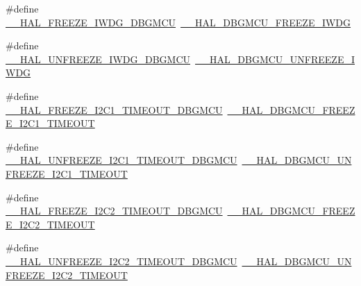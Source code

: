 \begin{DoxyCompactItemize}
\item 
\#define \hyperlink{group___h_a_l___d_b_g_m_c_u___aliased___macros_ga683080f08b123e73ee801508fac33188}{\+\_\+\+\_\+\+H\+A\+L\+\_\+\+F\+R\+E\+E\+Z\+E\+\_\+\+I\+W\+D\+G\+\_\+\+D\+B\+G\+M\+CU}~\hyperlink{group___h_a_l___exported___macros_gabab7ab631ba58fb6246a9385e8af9d0d}{\+\_\+\+\_\+\+H\+A\+L\+\_\+\+D\+B\+G\+M\+C\+U\+\_\+\+F\+R\+E\+E\+Z\+E\+\_\+\+I\+W\+DG}
\item 
\#define \hyperlink{group___h_a_l___d_b_g_m_c_u___aliased___macros_ga73aaa0abfab57e061c9e64ee39f5e3c8}{\+\_\+\+\_\+\+H\+A\+L\+\_\+\+U\+N\+F\+R\+E\+E\+Z\+E\+\_\+\+I\+W\+D\+G\+\_\+\+D\+B\+G\+M\+CU}~\hyperlink{group___h_a_l___exported___macros_gab29a88ef9c31cbe107c58b9ecc3bdf79}{\+\_\+\+\_\+\+H\+A\+L\+\_\+\+D\+B\+G\+M\+C\+U\+\_\+\+U\+N\+F\+R\+E\+E\+Z\+E\+\_\+\+I\+W\+DG}
\item 
\#define \hyperlink{group___h_a_l___d_b_g_m_c_u___aliased___macros_ga6e04cdfbd0408018f712455198c8120b}{\+\_\+\+\_\+\+H\+A\+L\+\_\+\+F\+R\+E\+E\+Z\+E\+\_\+\+I2\+C1\+\_\+\+T\+I\+M\+E\+O\+U\+T\+\_\+\+D\+B\+G\+M\+CU}~\hyperlink{group___h_a_l___exported___macros_ga6160f642dcff812be3a04c5b5c66e31d}{\+\_\+\+\_\+\+H\+A\+L\+\_\+\+D\+B\+G\+M\+C\+U\+\_\+\+F\+R\+E\+E\+Z\+E\+\_\+\+I2\+C1\+\_\+\+T\+I\+M\+E\+O\+UT}
\item 
\#define \hyperlink{group___h_a_l___d_b_g_m_c_u___aliased___macros_gae0a68ca652c73463c72c0d6f164ef675}{\+\_\+\+\_\+\+H\+A\+L\+\_\+\+U\+N\+F\+R\+E\+E\+Z\+E\+\_\+\+I2\+C1\+\_\+\+T\+I\+M\+E\+O\+U\+T\+\_\+\+D\+B\+G\+M\+CU}~\hyperlink{group___h_a_l___exported___macros_ga636083d6b6931b1cf35e7c39aebf0723}{\+\_\+\+\_\+\+H\+A\+L\+\_\+\+D\+B\+G\+M\+C\+U\+\_\+\+U\+N\+F\+R\+E\+E\+Z\+E\+\_\+\+I2\+C1\+\_\+\+T\+I\+M\+E\+O\+UT}
\item 
\#define \hyperlink{group___h_a_l___d_b_g_m_c_u___aliased___macros_ga2877e6a523cce3f5d72e9fcb746db130}{\+\_\+\+\_\+\+H\+A\+L\+\_\+\+F\+R\+E\+E\+Z\+E\+\_\+\+I2\+C2\+\_\+\+T\+I\+M\+E\+O\+U\+T\+\_\+\+D\+B\+G\+M\+CU}~\hyperlink{group___h_a_l___exported___macros_gacc31f8475c2e3e30ee99e53814faa523}{\+\_\+\+\_\+\+H\+A\+L\+\_\+\+D\+B\+G\+M\+C\+U\+\_\+\+F\+R\+E\+E\+Z\+E\+\_\+\+I2\+C2\+\_\+\+T\+I\+M\+E\+O\+UT}
\item 
\#define \hyperlink{group___h_a_l___d_b_g_m_c_u___aliased___macros_ga7f8561c59b23e6157a2a4854bfd7a152}{\+\_\+\+\_\+\+H\+A\+L\+\_\+\+U\+N\+F\+R\+E\+E\+Z\+E\+\_\+\+I2\+C2\+\_\+\+T\+I\+M\+E\+O\+U\+T\+\_\+\+D\+B\+G\+M\+CU}~\hyperlink{group___h_a_l___exported___macros_ga0308bdec86c19b7bbe236c4724d7d536}{\+\_\+\+\_\+\+H\+A\+L\+\_\+\+D\+B\+G\+M\+C\+U\+\_\+\+U\+N\+F\+R\+E\+E\+Z\+E\+\_\+\+I2\+C2\+\_\+\+T\+I\+M\+E\+O\+UT}

\end{DoxyCompactItemize}
